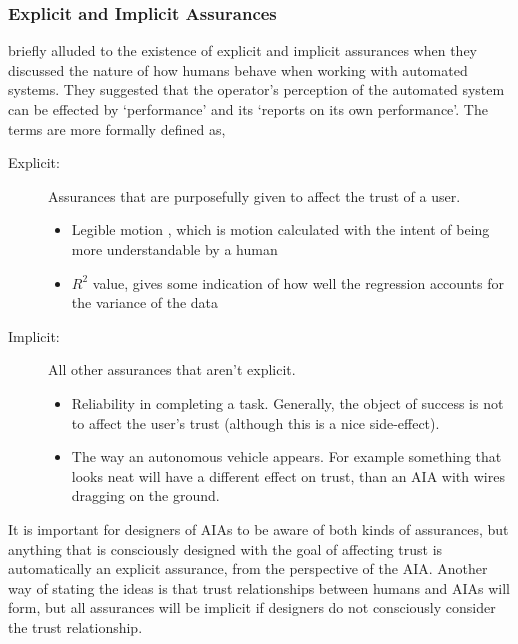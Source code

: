 \subsubsection{Explicit and Implicit Assurances}
\citet{Sheridan1984-kx} briefly alluded to the existence of explicit and implicit assurances when they discussed the nature of how humans behave when working with automated systems. They suggested that the operator's perception of the automated system can be effected by `performance' and its `reports on its own performance'. The terms are more formally defined as,

\begin{description}
    \item [Explicit:] Assurances that are purposefully given to affect the trust of a user.
    \begin{itemize}
        \item Legible motion \cite{Dragan2013-wd}, which is motion calculated with the intent of being more understandable by a human
        \item $R^2$ value, gives some indication of how well the regression accounts for the variance of the data
    \end{itemize}
    \item [Implicit:] All other assurances that aren't explicit.
    \begin{itemize}
        \item Reliability in completing a task. Generally, the object of success is not to affect the user's trust (although this is a nice side-effect).
        \item The way an autonomous vehicle appears. For example something that looks neat will have a different effect on trust, than an AIA with wires dragging on the ground. 
    \end{itemize}
\end{description}

It is important for designers of AIAs to be aware of both kinds of assurances, but anything that is consciously designed with the goal of affecting trust is automatically an explicit assurance, from the perspective of the AIA. Another way of stating the ideas is that trust relationships between humans and AIAs will form, but all assurances will be implicit if designers do not consciously consider the trust relationship. 

